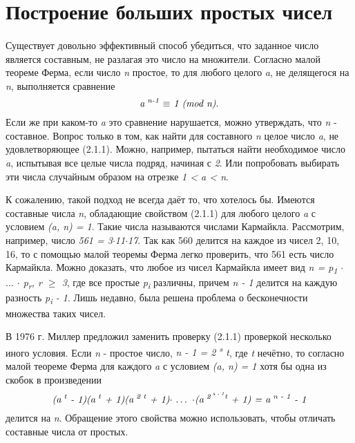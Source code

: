\section{Построение больших простых чисел}

\paragraph{} Существует довольно эффективный способ убедиться, что заданное число является составным, не разлагая это число на множители. 
Согласно малой теореме Ферма, если число \textit{n} простое, то для любого целого \textit{a}, не делящегося на \textit{n}, выполняется сравнение
\begin{equation}
 \textit{a\textsuperscript{ n-1} {$\equiv$} 1 (mod n)}.
\end{equation}
Если же при каком-то \textit{a} это сравнение нарушается, можно утверждать, что \textit{n} - составное. Вопрос только в том, как найти для составного \textit{n}
целое число \textit{a}, не удовлетворяющее (2.1.1). Можно, например, пытаться найти необходимое число \textit{a}, испытывая все целые числа подряд, 
начиная с \textit{2}. Или попробовать выбирать эти числа случайным образом на отрезке \textit{1 < a < n}.

  К сожалению, такой подход не всегда даёт то, что хотелось бы. Имеются составные числа \textit{n}, обладающие свойством (2.1.1) для любого целого
\textit{a} с условием \textit{(a, n) = 1}. Такие числа называются числами Кармайкла. Рассмотрим, например, число \textit{561 = 3{$\cdot$}11{$\cdot$}17}. 
Так как 560 делится на каждое из чисел 2, 10, 16, то с помощью малой теоремы Ферма легко проверить, что 561 есть число Кармайкла. 
Можно доказать, что любое из чисел Кармайкла имеет вид \textit{n = p\textsubscript{1} {$\cdot$} {$\dots$} {$\cdot$} p\textsubscript{r}, r {$\geq$} 3}, 
где все простые \textit{p\textsubscript{i}} различны, причем \textit{n - 1} делится на каждую разность \textit{p\textsubscript{i} - 1}. 
Лишь недавно, была решена проблема о бесконечности множества таких чисел.

  В 1976 г. Миллер предложил заменить проверку (2.1.1) проверкой несколько иного условия. Если \textit{n} - простое число, 
\textit{n - 1 = 2\textsuperscript{ s} t}, где \textit{t} нечётно, то согласно малой теореме Ферма для каждого \textit{a} с 
условием \textit{(a, n) = 1} хотя бы одна из скобок в произведении
\begin{equation}
 \textit{(a\textsuperscript{ t} - 1)(a\textsuperscript{ t} + 1)(a\textsuperscript{ 2 t} + 1){$\cdot$} {$\dots$} {$\cdot$}(a\textsuperscript{ 2\textsuperscript{ s - 1}t} + 1) = a\textsuperscript{ n - 1} - 1}
\end{equation}
делится на \textit{n}. Обращение этого свойства можно использовать, чтобы отличать составные числа от простых.

